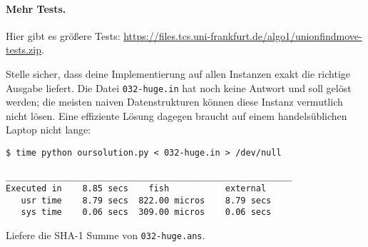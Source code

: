 \documentclass{uebung_cs}
\begin{document}
\begin{aufgabe}
  \paragraph{Mehr Tests.}
  Hier gibt es größere Tests:
  \small\url{https://files.tcs.uni-frankfurt.de/algo1/unionfindmove-tests.zip}.

	Stelle sicher, dass deine Implementierung auf allen Instanzen exakt die richtige Ausgabe liefert.
  Die Datei \verb|032-huge.in| hat noch keine Antwort und soll gelöst werden;
	die meisten naiven Datenstrukturen können diese Instanz vermutlich nicht lösen.
  Eine effiziente Lösung dagegen braucht auf einem handelsüblichen Laptop nicht lange:
  \begin{verbatim}
$ time python oursolution.py < 032-huge.in > /dev/null

________________________________________________________
Executed in    8.85 secs    fish           external
   usr time    8.79 secs  822.00 micros    8.79 secs
   sys time    0.06 secs  309.00 micros    0.06 secs
  \end{verbatim}
  Liefere die SHA-1 Summe von \verb|032-huge.ans|.

\end{aufgabe}
\end{document}
